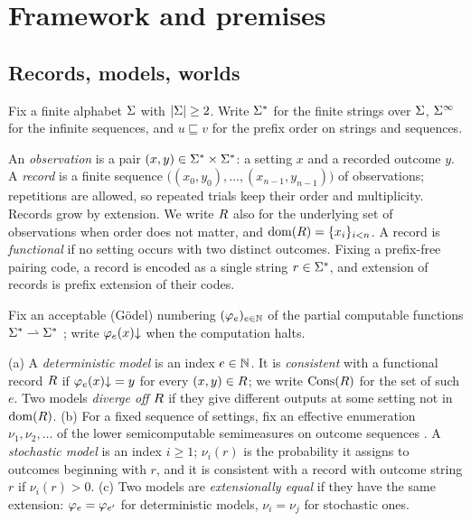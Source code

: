 \section{Framework and premises}\label{sec:framework}

\subsection{Records, models, worlds}

Fix a finite alphabet $\Sigma$ with $|\Sigma|\ge 2$. Write $\Sigma^{*}$ for the finite strings
over $\Sigma$, $\Sigma^{\infty}$ for the infinite sequences, and $u\sqsubseteq v$ for the prefix
order on strings and sequences.

\begin{definition}[Record]\label{def:record}
An \emph{observation} is a pair $(x,y)\in\Sigma^{*}\times\Sigma^{*}$: a setting $x$ and a
recorded outcome $y$. A \emph{record} is a finite sequence
$\big((x_0,y_0),\dots,(x_{n-1},y_{n-1})\big)$ of observations; repetitions are
allowed, so repeated trials keep their order and multiplicity. Records grow by
extension. We write $R$ also for the underlying set of observations when order
does not matter, and $\operatorname{dom}(R)=\{x_i\}_{i<n}$. A record is \emph{functional} if no
setting occurs with two distinct outcomes. Fixing a prefix-free pairing code, a
record is encoded as a single string $r\in\Sigma^{*}$, and extension of records is prefix
extension of their codes.
\end{definition}

Fix an acceptable (G\"odel) numbering $(\varphi_{e})_{e\in\mathbb{N}}$ of the partial computable
functions $\Sigma^{*}\rightharpoonup\Sigma^{*}$ \citep{rogers1967}; write $\varphi_{e}(x)\mathord{\downarrow}$ when
the computation halts.

\begin{definition}[Model]\label{def:model}\label{def:probmodel}
(a) A \emph{deterministic model} is an index $e\in\mathbb{N}$. It is \emph{consistent} with a
functional record $R$ if $\varphi_{e}(x)\mathord{\downarrow}=y$ for every $(x,y)\in R$; we write
$\operatorname{Cons}(R)$ for the set of such $e$. Two models \emph{diverge off} $R$ if they
give different outputs at some setting not in $\operatorname{dom}(R)$.
(b) For a fixed sequence of settings, fix an effective enumeration
$\nu_1,\nu_2,\dots$ of the lower semicomputable semimeasures on outcome sequences
\citep{li-vitanyi2019}. A \emph{stochastic model} is an index $i\ge1$; $\nu_i(r)$ is the
probability it assigns to outcomes beginning with $r$, and it is consistent with a
record with outcome string $r$ if $\nu_i(r)>0$.
(c) Two models are \emph{extensionally equal} if they have the same extension:
$\varphi_{e}=\varphi_{e'}$ for deterministic models, $\nu_i=\nu_j$ for stochastic ones.
\end{definition}

